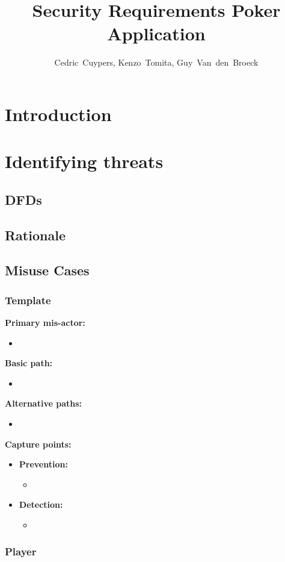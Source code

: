 \documentclass[a4paper,11pt]{report}
\author{Cedric~Cuypers, Kenzo~Tomita, Guy~Van~den~Broeck}
\title{Security Requirements Poker Application}
\begin{document}
 
\maketitle 
\tableofcontents 

\chapter{Introduction}
\chapter{Identifying threats}
\section{DFDs}
\section{Rationale}
\section{Misuse Cases}
\subsection{Template}
\textbf{Primary mis-actor:}
\begin{itemize}
\item 
\end{itemize}
\textbf{Basic path:}
\begin{itemize}
\item 
\end{itemize}
\textbf{Alternative paths:}
\begin{itemize}
\item 
\end{itemize}
\textbf{Capture points:}
\begin{itemize}
\item \textbf{Prevention:}
\begin{itemize}
\item 
\end{itemize}
\item \textbf{Detection:}
\begin{itemize}
\item 
\end{itemize}
\end{itemize}

\subsection{Player}
\end{document}

